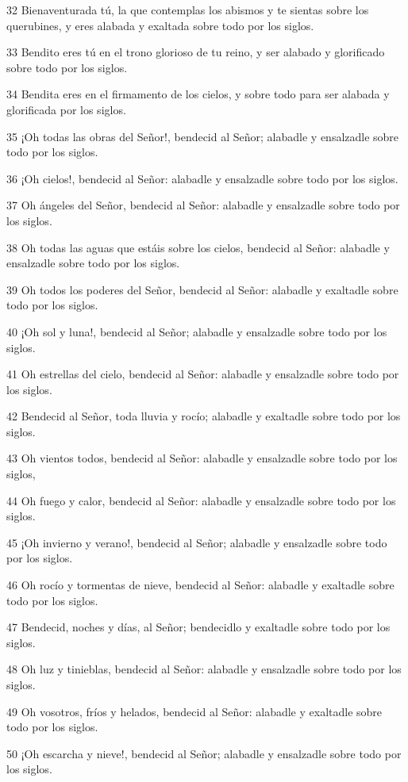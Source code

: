 \par 32 Bienaventurada tú, la que contemplas los abismos y te sientas sobre los querubines, y eres alabada y exaltada sobre todo por los siglos.
\par 33 Bendito eres tú en el trono glorioso de tu reino, y ser alabado y glorificado sobre todo por los siglos.
\par 34 Bendita eres en el firmamento de los cielos, y sobre todo para ser alabada y glorificada por los siglos.
\par 35 ¡Oh todas las obras del Señor!, bendecid al Señor; alabadle y ensalzadle sobre todo por los siglos.
\par 36 ¡Oh cielos!, bendecid al Señor: alabadle y ensalzadle sobre todo por los siglos.
\par 37 Oh ángeles del Señor, bendecid al Señor: alabadle y ensalzadle sobre todo por los siglos.
\par 38 Oh todas las aguas que estáis sobre los cielos, bendecid al Señor: alabadle y ensalzadle sobre todo por los siglos.
\par 39 Oh todos los poderes del Señor, bendecid al Señor: alabadle y exaltadle sobre todo por los siglos.
\par 40 ¡Oh sol y luna!, bendecid al Señor; alabadle y ensalzadle sobre todo por los siglos.
\par 41 Oh estrellas del cielo, bendecid al Señor: alabadle y ensalzadle sobre todo por los siglos.
\par 42 Bendecid al Señor, toda lluvia y rocío; alabadle y exaltadle sobre todo por los siglos.
\par 43 Oh vientos todos, bendecid al Señor: alabadle y ensalzadle sobre todo por los siglos,
\par 44 Oh fuego y calor, bendecid al Señor: alabadle y ensalzadle sobre todo por los siglos.
\par 45 ¡Oh invierno y verano!, bendecid al Señor; alabadle y ensalzadle sobre todo por los siglos.
\par 46 Oh rocío y tormentas de nieve, bendecid al Señor: alabadle y exaltadle sobre todo por los siglos.
\par 47 Bendecid, noches y días, al Señor; bendecidlo y exaltadle sobre todo por los siglos.
\par 48 Oh luz y tinieblas, bendecid al Señor: alabadle y ensalzadle sobre todo por los siglos.
\par 49 Oh vosotros, fríos y helados, bendecid al Señor: alabadle y exaltadle sobre todo por los siglos.
\par 50 ¡Oh escarcha y nieve!, bendecid al Señor; alabadle y ensalzadle sobre todo por los siglos.
